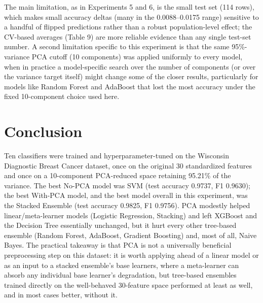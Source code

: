 \documentclass[11pt,a4paper]{article}
\begin{document}
The main limitation, as in Experiments 5 and 6, is the small test set (114 rows), which makes small accuracy deltas (many in the 0.0088--0.0175 range) sensitive to a handful of flipped predictions rather than a robust population-level effect; the CV-based averages (Table 9) are more reliable evidence than any single test-set number. A second limitation specific to this experiment is that the same 95\%-variance PCA cutoff (10 components) was applied uniformly to every model, when in practice a model-specific search over the number of components (or over the variance target itself) might change some of the closer results, particularly for models like Random Forest and AdaBoost that lost the most accuracy under the fixed 10-component choice used here.

\section{Conclusion}
Ten classifiers were trained and hyperparameter-tuned on the Wisconsin Diagnostic Breast Cancer dataset, once on the original 30 standardized features and once on a 10-component PCA-reduced space retaining 95.21\% of the variance. The best No-PCA model was SVM (test accuracy 0.9737, F1 0.9630); the best With-PCA model, and the best model overall in this experiment, was the Stacked Ensemble (test accuracy 0.9825, F1 0.9756). PCA modestly helped linear/meta-learner models (Logistic Regression, Stacking) and left XGBoost and the Decision Tree essentially unchanged, but it hurt every other tree-based ensemble (Random Forest, AdaBoost, Gradient Boosting) and, most of all, Naive Bayes. The practical takeaway is that PCA is not a universally beneficial preprocessing step on this dataset: it is worth applying ahead of a linear model or as an input to a stacked ensemble's base learners, where a meta-learner can absorb any individual base learner's degradation, but tree-based ensembles trained directly on the well-behaved 30-feature space performed at least as well, and in most cases better, without it.

\end{document}
